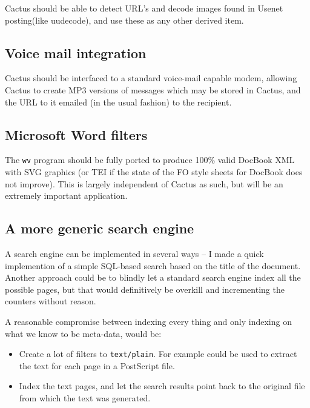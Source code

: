 Cactus should be able to detect URL's and decode images found in
Usenet posting(like uudecode), and use these as any other derived
item.


\subsection*{Voice mail integration}

Cactus should be interfaced to a standard voice-mail capable modem,
allowing Cactus to create MP3 versions of messages which may be stored
in Cactus, and the URL to it emailed (in the usual fashion) to the
recipient.


\subsection*{Microsoft Word filters}

The \texttt{wv} program should be fully ported to produce 100\% valid
DocBook XML with SVG graphics (or TEI if the state of the FO style
sheets for DocBook does not improve).  This is largely independent of
Cactus as such, but will be an extremely important application.


\subsection*{A more generic search engine}

A search engine can be implemented in several ways -- I made a quick
implemention of a simple SQL-based search based on the title of the
document.  Another approach could be to blindly let a standard search
engine index all the possible pages, but that would definitively be
overkill and incrementing the counters without reason.

A reasonable compromise between indexing every thing and only indexing
on what we know to be meta-data, would be:

\begin{itemize}
\item Create a lot of filters to \texttt{text/plain}.  For example
  could
  be used to extract the text for each page in a PostScript file.

\item
  Index the text pages, and let the search results point back to the
  original file from which the text was generated.
\end{itemize}

